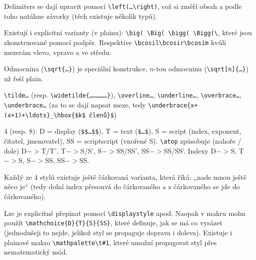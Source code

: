 \documentclass[12pt]{article}					%
\begin{document}
    \begin{definice}[Delimeters]
        Delimiters se dají upravit pomocí \verb|\left(…\right)|, což si změří obsah a podle toho natáhne závorky (těch existuje několik typů).

        Existují i explicitní varianty (v plainu): \verb|\big( \Big( \bigg( \Bigg(\|, které jsou zkonstruované pomocí podpěr. Respektive \verb|\bcosil\bcosir\bcosim| kvůli mezerám vlevo, vpravo a ve středu.
    \end{definice}

    \begin{definice}[Odmocnina]
        Odmocnina (\verb|\sqrt{…}|) je speciální konstrukce, $n$-tou odmocninu (\verb|\sqrt[n]{…}|) už řeší plain.
    \end{definice}
    
    \begin{definice}[Akcenty]
        

        \verb|\tilde…| (resp. \verb|\widetilde{……………}|), \verb|\overline…|, \verb|\underline…|, \verb|\overbrace…|, \verb|\underbrace…| (za to se dají napsat meze, tedy \verb|\underbrace{x+(x+1)+\ldots}_\hbox{$k$ členů}$|)
    \end{definice}

    \begin{definice}[Styly]
        4 (resp. 8): D = display (\verb|$$…$$|), T = text (\verb|$…$|), S = script (index, exponent, čitatel, jmenovatel), SS = scriptscript (vnořené S). \verb|\atop| způsobuje (nahoře / dole) D$->$T/T', T$->$S/S', S$->$SS/SS', SS$->$SS/SS'. Indexy D$->$S, T$->$S, S$->$SS, SS$->$SS.

        Každý ze 4 stylů existuje ještě čárkovaná varianta, která říká: „nade mnou ještě něco je“ (tedy dolní index přesouvá do čárkovaného a z čárkovaného se jde do čárkovaného).

        Lze je explicitně přepínat pomocí \verb|\displaystyle| apod. Naopak v makru mohu použít \verb|\mathchoice{D}{T}{S}{SS}|, které definuje, jak se má co vysázet (jednodušeji to nejde, jelikož styl se propaguje doprava i doleva). Existuje i plainové makro \verb|\mathpalette\t#1|, které umožní propagovat styl přes nematematický mód.
    \end{definice}
\end{document}
